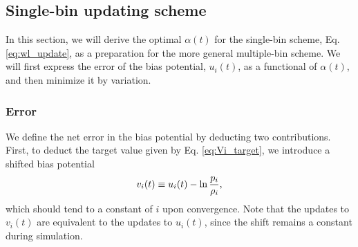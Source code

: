 \documentclass[preprint, superscriptaddress, floatfix]{revtex4-1}
\begin{document}
%






\subsection{\label{sec:single-bin}
Single-bin updating scheme}



In this section,
we will derive the optimal $\alpha(t)$
for the single-bin scheme,
Eq. \eqref{eq:wl_update},
as a preparation
for the more general multiple-bin scheme.
%
%
We will first express the error of
the bias potential, $u_i(t)$,
as a functional of $\alpha(t)$,
and then minimize it by variation.
%



\subsubsection{Error}



We define the net error in the bias potential
by deducting two contributions.
%
First, to deduct the target value given by
Eq. \eqref{eq:Vi_target},
we introduce a shifted bias potential
%
\begin{equation}
  v_i(t)
  \equiv
  u_i(t)
  -
  \ln \frac { p_i }
            { \rho_i }
  ,
  \notag
\end{equation}
%
which should tend to a constant of $i$
upon convergence.
Note that the updates to $v_i(t)$ are
equivalent to the updates to $u_i(t)$,
since the shift
remains a constant during simulation.
\end{document}
